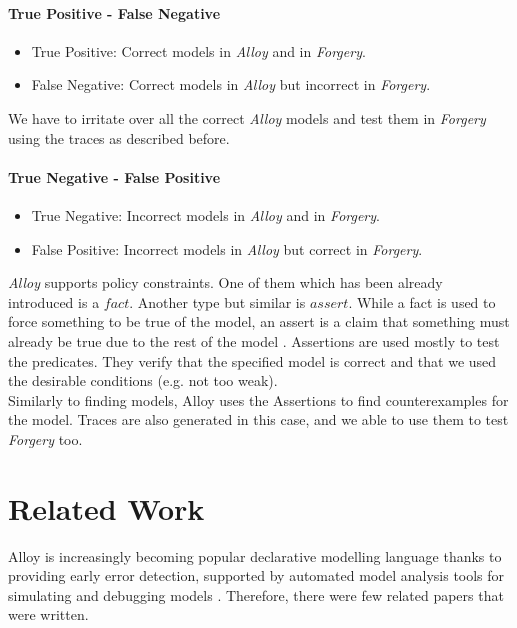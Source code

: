 \documentclass[oneside]{book}
\begin{document}
\subsubsection{True Positive - False Negative}
\begin{itemize}
  \item True Positive: Correct models in \textit{Alloy} and in \textit{Forgery}.
  \item False Negative: Correct models in \textit{Alloy} but incorrect in \textit{Forgery}.
\end{itemize}

We have to irritate over all the correct \textit{Alloy} models and test them in \textit{Forgery} using the traces as described before.

\subsubsection{True Negative - False Positive}
\begin{itemize}
  \item True Negative: Incorrect models in \textit{Alloy} and in \textit{Forgery}.
  \item False Positive: Incorrect models in \textit{Alloy} but correct in \textit{Forgery}.
\end{itemize}

\textit{Alloy} supports policy constraints. One of them which has been already introduced is a $fact$. Another type but similar is $assert$. While a fact is used to force something to be true of the model, an assert is a claim that something must already be true due to the rest of the model \cite{alloytutorial}. Assertions are used mostly to test the predicates. They verify that the specified model is correct and that we used the desirable conditions (e.g. not too weak).\\

Similarly to finding models, Alloy uses the Assertions to find counterexamples for the model. Traces are also generated in this case, and we able to use them to test \textit{Forgery} too.

\newpage

\chapter{Related Work}

Alloy is increasingly becoming popular declarative modelling language thanks to providing early error detection, supported by automated model analysis tools for simulating and debugging models \cite{lightning}. Therefore, there were few related papers that were written.
\end{document}
